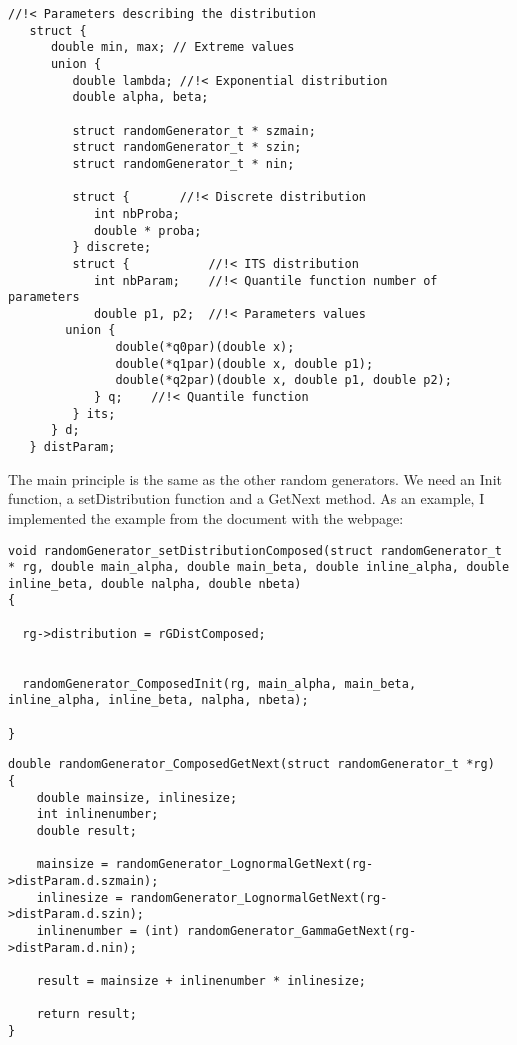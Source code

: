 \begin{verbatim}
//!< Parameters describing the distribution 
   struct {
      double min, max; // Extreme values
      union {
         double lambda; //!< Exponential distribution
         double alpha, beta;
        
         struct randomGenerator_t * szmain;
         struct randomGenerator_t * szin;
         struct randomGenerator_t * nin;

         struct {       //!< Discrete distribution
            int nbProba;
            double * proba;
         } discrete;
         struct {           //!< ITS distribution
            int nbParam;    //!< Quantile function number of parameters 
            double p1, p2;  //!< Parameters values
	    union {
               double(*q0par)(double x);
               double(*q1par)(double x, double p1);
               double(*q2par)(double x, double p1, double p2);
            } q;    //!< Quantile function
         } its;
      } d;
   } distParam; 
\end{verbatim}

 The main principle is the same as the other random generators.
We need an Init function, a setDistribution function and a GetNext method.
As an example, I implemented the example from the document with the webpage:

\begin{verbatim}
void randomGenerator_setDistributionComposed(struct randomGenerator_t * rg, double main_alpha, double main_beta, double inline_alpha, double inline_beta, double nalpha, double nbeta)
{
 
  rg->distribution = rGDistComposed;
  

  randomGenerator_ComposedInit(rg, main_alpha, main_beta, inline_alpha, inline_beta, nalpha, nbeta);

}
\end{verbatim}


\begin{verbatim}
double randomGenerator_ComposedGetNext(struct randomGenerator_t *rg)
{
    double mainsize, inlinesize;
    int inlinenumber;
    double result;
    
    mainsize = randomGenerator_LognormalGetNext(rg->distParam.d.szmain);
    inlinesize = randomGenerator_LognormalGetNext(rg->distParam.d.szin);
    inlinenumber = (int) randomGenerator_GammaGetNext(rg->distParam.d.nin);
    
    result = mainsize + inlinenumber * inlinesize;    

    return result;
}
\end{verbatim}


